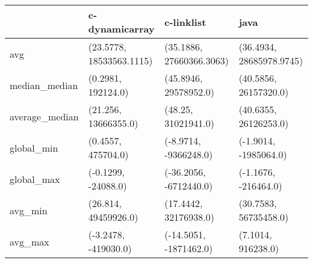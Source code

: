 \begin{tabular}{llll}
\toprule
{} &            c-dynamicarray &                c-linklist &                      java \\
\midrule
avg            &  (23.5778, 18533563.1115) &  (35.1886, 27660366.3063) &  (36.4934, 28685978.9745) \\
median\_median  &        (0.2981, 192124.0) &     (45.8946, 29578952.0) &     (40.5856, 26157320.0) \\
average\_median &      (21.256, 13666355.0) &       (48.25, 31021941.0) &     (40.6355, 26126253.0) \\
global\_min     &        (0.4557, 475704.0) &     (-8.9714, -9366248.0) &     (-1.9014, -1985064.0) \\
global\_max     &       (-0.1299, -24088.0) &    (-36.2056, -6712440.0) &      (-1.1676, -216464.0) \\
avg\_min        &      (26.814, 49459926.0) &     (17.4442, 32176938.0) &     (30.7583, 56735458.0) \\
avg\_max        &      (-3.2478, -419030.0) &    (-14.5051, -1871462.0) &        (7.1014, 916238.0) \\
\bottomrule
\end{tabular}
